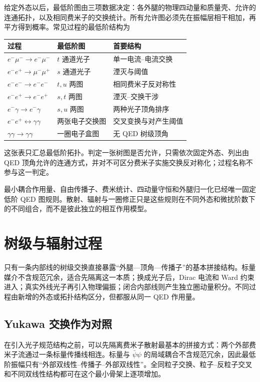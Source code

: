 给定外态以后，最低阶图由三项数据决定：各外腿的物理四动量和质量壳、允许的连通拓扑，以及相同费米子的交换统计。所有允许图必须先在振幅层相干相加，再平方得到概率。常见过程的最低阶结构为
\begin{center}
\begin{tabular}{lll}
\toprule
过程 & 最低阶图 & 首要结构 \\
\midrule
$e^-\mu^-\to e^-\mu^-$ & $t$ 通道光子 & 单一电流--电流交换 \\
$e^-e^+\to\mu^-\mu^+$ & $s$ 通道光子 & 湮灭与阈值 \\
$e^-e^-\to e^-e^-$ & $t,u$ 两图 & 相同费米子反对称性 \\
$e^-e^+\to e^-e^+$ & $s,t$ 两图 & 湮灭--交换干涉 \\
$e^-\gamma\to e^-\gamma$ & $s,u$ 两图 & 两种光子顶角排序 \\
$e^-e^+\leftrightarrow\gamma\gamma$ & 两张电子交换图 & 交叉变换与对产生阈值 \\
$\gamma\gamma\to\gamma\gamma$ & 一圈电子盒图 & 无 QED 树级顶角 \\
\bottomrule
\end{tabular}
\end{center}
这张表只汇总最低阶拓扑。判定一张树图是否允许，只需依次固定外态、列出由 QED 顶角允许的连通方式，并对不可区分费米子实施交换反对称化；过程名称不参与这一判定。

最小耦合作用量、自由传播子、费米统计、四动量守恒和外腿归一化已经唯一固定低阶 QED 图规则。散射、辐射与一圈修正只是这些规则在不同外态和微扰阶数下的不同组合，而不是彼此独立的相互作用模型。

\section{树级与辐射过程}

只有一条内部线的树级交换直接暴露“外腿—顶角—传播子”的基本拼接结构。标量媒介不含规范冗余，适合先隔离这一本质；换成光子后，Dirac 电流和 Ward 约束进入；真实外线光子再引入物理偏振；闭合内部线则产生独立圈动量积分。不同过程由新增的外态或拓扑结构区分，但都服从同一 QED 作用量。
\subsection{Yukawa 交换作为对照}

在引入光子规范结构之前，可以先隔离费米子散射最基本的拼接方式：两个外部费米子流通过一条标量传播线相连。标量与 $\bar\psi\psi$ 的局域耦合不含规范冗余，因此最低阶振幅只有“外部双线性--传播子--外部双线性”。全同粒子交换、粒子--反粒子交叉和不同双线性结构都可在这个最小骨架上逐项增加。

